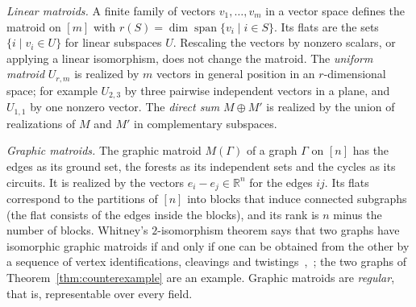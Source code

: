 \documentclass[11pt,a4paper]{article}
\numberwithin{equation}{section}
\theoremstyle{plain}
\theoremstyle{definition}
\theoremstyle{remark}
\newcommand{\R}{\mathbb{R}}
\DeclareMathOperator{\spn}{span}
\begin{document}
\emph{Linear matroids.} A finite family of vectors $v_1,\dots,v_m$ in a vector space defines the matroid on $[m]$ with $r(S)=\dim\spn\{v_i\mid i\in S\}$. Its flats are the sets $\{i\mid v_i\in U\}$ for linear subspaces $U$. Rescaling the vectors by nonzero scalars, or applying a linear isomorphism, does not change the matroid. The \emph{uniform matroid} $U_{r,m}$ is realized by $m$ vectors in general position in an $r$-dimensional space; for example $U_{2,3}$ by three pairwise independent vectors in a plane, and $U_{1,1}$ by one nonzero vector. The \emph{direct sum} $M\oplus M'$ is realized by the union of realizations of $M$ and $M'$ in complementary subspaces.

\emph{Graphic matroids.} The graphic matroid $M(\Gamma)$ of a graph $\Gamma$ on $[n]$ has the edges as its ground set, the forests as its independent sets and the cycles as its circuits. It is realized by the vectors $e_i-e_j\in\R^n$ for the edges $ij$. Its flats correspond to the partitions of $[n]$ into blocks that induce connected subgraphs (the flat consists of the edges inside the blocks), and its rank is $n$ minus the number of blocks. Whitney's $2$-isomorphism theorem says that two graphs have isomorphic graphic matroids if and only if one can be obtained from the other by a sequence of vertex identifications, cleavings and twistings~\cite{Whi33},~\cite[§5.3]{Oxl11}; the two graphs of Theorem~\ref{thm:counterexample} are an example. Graphic matroids are \emph{regular}, that is, representable over every field.
\end{document}
